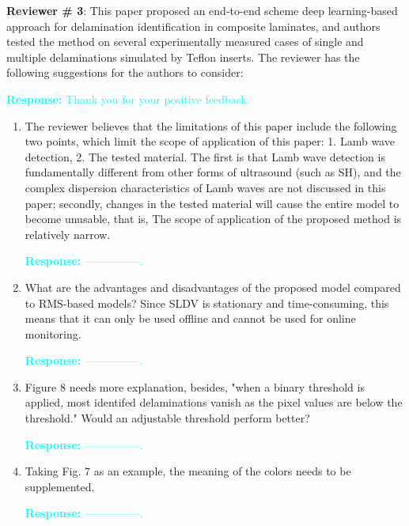 \documentclass[11pt,a2paper]{report}
\begin{document}
\newpage 
\textbf{Reviewer \# 3}:
\newline This paper proposed an end-to-end scheme deep learning-based approach 
for delamination identification in composite laminates, and authors tested the 
method on several experimentally measured cases of single and multiple 
delaminations simulated by Teﬂon inserts. The reviewer has the following 
suggestions for the authors to consider:

\textcolor{Cyan}{
	\newline\textbf{Response:}
	Thank you for your positive feedback.
}
\begin{enumerate}
	\item The reviewer believes that the limitations of this paper include the 
	following two points, which limit the scope of application of this paper: 
	1. Lamb wave detection, 2. The tested material. The first is that Lamb wave 
	detection is fundamentally different from other forms of ultrasound (such 
	as SH), and the complex dispersion characteristics of Lamb waves are not 
	discussed in this paper; secondly, changes in the tested material will 
	cause the entire model to become unusable, that is, The scope of 
	application of the proposed method is relatively narrow.
	
	\textcolor{Cyan}{
		\textbf{Response:}
		---------------.
	}
	
	\item What are the advantages and disadvantages of the proposed model 
	compared to RMS-based models? Since SLDV is stationary and time-consuming, 
	this means that it can only be used offline and cannot be used for online 
	monitoring.
	
	\textcolor{Cyan}{
		\textbf{Response:}
		---------------.
	}
	\item Figure 8 needs more explanation, besides, "when a binary threshold is 
	applied, most identifed delaminations vanish as the pixel values are below 
	the threshold." Would an adjustable threshold perform better?
	
	\textcolor{Cyan}{
		\textbf{Response:}
		---------------.
	}
	
	\item Taking Fig. 7 as an example, the meaning of the colors needs to be 
	supplemented.
	
	\textcolor{Cyan}{
		\textbf{Response:}
		---------------.
	}	
	
\end{enumerate}	
\end{document}
